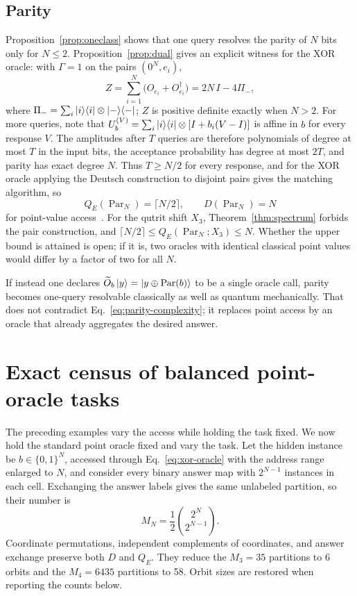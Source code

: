 \documentclass[
  aps,
  pra,
  reprint,
  nofootinbib
]{revtex4-2}
\begin{document}
\subsection{Parity}

Proposition~\ref{prop:oneclass} shows that one query resolves the parity of
\(N\) bits only for \(N\le2\). Proposition~\ref{prop:dual} gives an explicit
witness for the XOR oracle: with \(\Gamma=1\) on the pairs \((0^N,e_i)\),
\begin{equation}
 Z=\sum_{i=1}^N\bigl(O_{e_i}+O_{e_i}^\dagger\bigr)=2N\,I-4\Pi_-,
 \label{eq:parity-witness}
\end{equation}
where \(\Pi_-=\sum_{i}\ket i\!\bra i\otimes\ket-\!\bra-\); \(Z\) is positive
definite exactly when \(N>2\). For more queries, note that
\(U_b^{(V)}=\sum_i\ket i\!\bra i\otimes[I+b_i(V-I)]\) is affine in \(b\) for
every response \(V\). The amplitudes after \(T\) queries are therefore
polynomials of degree at most \(T\) in the input bits, the acceptance
probability has degree at most \(2T\), and parity has exact degree \(N\). Thus
\(T\ge N/2\) for every response, and for the XOR oracle applying the Deutsch
construction to disjoint pairs gives the matching algorithm, so
\begin{equation}
 Q_E(\operatorname{Par}_N)=\lceil N/2\rceil,
 \qquad D(\operatorname{Par}_N)=N
 \label{eq:parity-complexity}
\end{equation}
for point-value access~\cite{bbcmw-01,Farhi-98}. For the qutrit shift \(X_3\),
Theorem~\ref{thm:spectrum} forbids the pair construction, and
\(\lceil N/2\rceil\le Q_E(\operatorname{Par}_N;X_3)\le N\). Whether the upper
bound is attained is open; if it is, two oracles with identical classical point
values would differ by a factor of two for all \(N\).

If instead one declares \(\widetilde O_b\ket y=\ket{y\oplus\operatorname{Par}(b)}\)
to be a single oracle call, parity becomes one-query resolvable classically as
well as quantum mechanically. That does not contradict
Eq.~\eqref{eq:parity-complexity}; it replaces point access by an oracle that
already aggregates the desired answer.

\section{Exact census of balanced point-oracle tasks}
\label{sec:census}

The preceding examples vary the access while holding the task fixed. We now
hold the standard point oracle fixed and vary the task. Let the hidden instance
be \(b\in\{0,1\}^N\), accessed through Eq.~\eqref{eq:xor-oracle} with the
address range enlarged to \(N\), and consider every binary answer map with
\(2^{N-1}\) instances in each cell. Exchanging the answer labels gives the same
unlabeled partition, so their number is
\begin{equation}
 M_N=\frac12\binom{2^N}{2^{N-1}}.
 \label{eq:balanced-count}
\end{equation}
Coordinate permutations, independent complements of coordinates, and answer
exchange preserve both \(D\) and \(Q_E\). They reduce the \(M_3=35\) partitions
to 6 orbits and the \(M_4=6435\) partitions to 58. Orbit sizes are restored
when reporting the counts below.
\end{document}
